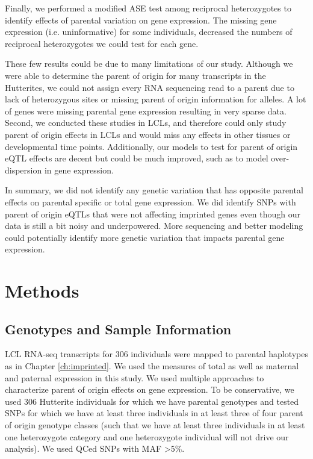 Finally, we performed a modified ASE test among reciprocal heterozygotes to identify effects of parental variation on gene expression. The missing gene expression (i.e. uninformative) for some individuals, decreased the numbers of reciprocal heterozygotes we could test for each gene.

These few results could be due to many limitations of our study. Although we were able to determine the parent of origin for many transcripts in the Hutterites, we could not assign every RNA sequencing read to a parent due to lack of heterozygous sites or missing parent of origin information for alleles. A lot of genes were missing parental gene expression resulting in very sparse data. Second, we conducted these studies in LCLs, and therefore could only study parent of origin effects in LCLs and would miss any effects in other tissues or developmental time points. Additionally, our models to test for parent of origin eQTL effects are decent but could be much improved, such as to model over-dispersion in gene expression.

In summary, we did not identify any genetic variation that has opposite parental effects on parental specific or total gene expression. We did identify SNPs with parent of origin eQTLs that were not affecting imprinted genes even though our data is still a bit noisy and underpowered. More sequencing and better modeling could potentially identify more genetic variation that impacts parental gene expression.

\section{Methods}\label{ch04-methods}

\subsection{Genotypes and Sample Information}\label{Genotypes and Sample Information}
LCL RNA-seq transcripts for 306 individuals were mapped to parental haplotypes as in Chapter \ref{ch:imprinted}. We used the measures of total as well as maternal and paternal expression in this study. We used multiple approaches to characterize parent of origin effects on gene expression.
To be conservative, we used 306 Hutterite individuals for which we have parental genotypes and tested SNPs for which we have at least three individuals in at least three of four parent of origin genotype classes (such that we have at least three individuals in at least one heterozygote category and one heterozygote individual will not drive our analysis). We used QCed SNPs with MAF \textgreater 5\%.

